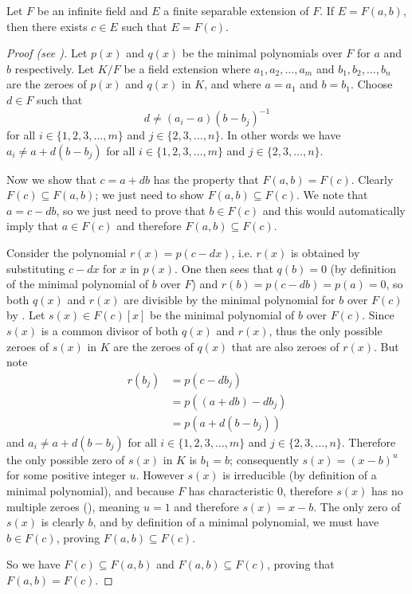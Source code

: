 \begin{lemma}\label{lemma-primitive-element}
    Let $F$ be an infinite field and $E$ a finite separable extension of $F$. If $E = F(a, b)$, then there exists $c \in E$ such that $E = F(c)$.
\end{lemma}
\begin{proof}[Proof (see {\cite[Theorem 21.6]{gallian_2016}})]
    Let $p(x)$ and $q(x)$ be the minimal polynomials over $F$ for $a$ and $b$ respectively. Let $K/F$ be a field extension where $a_1, a_2, \dots, a_m$ and $b_1, b_2, \dots, b_n$ are the zeroes of $p(x)$ and $q(x)$ in $K$, and where $a = a_1$ and $b = b_1$. Choose $d \in F$ such that
    \[
        d \neq (a_i-a)(b-b_j)^{-1}
    \]
    for all $i \in \{1, 2, 3, \dots, m\}$ and $j \in \{2, 3, \dots, n\}$. In other words we have $a_i \neq a + d(b-b_j)$ for all $i \in \{1, 2, 3, \dots, m\}$ and $j \in \{2, 3, \dots, n\}$.

    Now we show that $c = a + db$ has the property that $F(a, b) = F(c)$. Clearly $F(c) \subseteq F(a, b)$; we just need to show $F(a, b) \subseteq F(c)$. We note that $a = c - db$, so we just need to prove that $b \in F(c)$ and this would automatically imply that $a \in F(c)$ and therefore $F(a,b) \subseteq F(c)$.

    Consider the polynomial $r(x) = p(c - dx)$, i.e. $r(x)$ is obtained by substituting $c - dx$ for $x$ in $p(x)$. One then sees that $q(b) = 0$ (by definition of the minimal polynomial of $b$ over $F$) and $r(b) = p(c - db) = p(a) = 0$, so both $q(x)$ and $r(x)$ are divisible by the minimal polynomial for $b$ over $F(c)$ by . Let $s(x) \in F(c)[x]$ be the minimal polynomial of $b$ over $F(c)$. Since $s(x)$ is a common divisor of both $q(x)$ and $r(x)$, thus the only possible zeroes of $s(x)$ in $K$ are the zeroes of $q(x)$ that are also zeroes of $r(x)$. But note
    \begin{align*}
        r(b_j) &= p(c-db_j)\\
        &= p((a+db) - db_j)\\
        &= p(a+d(b-b_j))
    \end{align*}
    and $a_i \neq a+d(b-b_j)$ for all $i \in \{1, 2, 3, \dots, m\}$ and $j \in \{2, 3, \dots, n\}$. Therefore the only possible zero of $s(x)$ in $K$ is $b_1 = b$; consequently $s(x) = (x-b)^u$ for some positive integer $u$. However $s(x)$ is irreducible (by definition of a minimal polynomial), and because $F$ has characteristic 0, therefore $s(x)$ has no multiple zeroes (), meaning $u = 1$ and therefore $s(x) = x-b$. The only zero of $s(x)$ is clearly $b$, and by definition of a minimal polynomial, we must have $b \in F(c)$, proving $F(a, b) \subseteq F(c)$.

    So we have $F(c) \subseteq F(a, b)$ and $F(a, b) \subseteq F(c)$, proving that $F(a, b) = F(c)$.
\end{proof}

